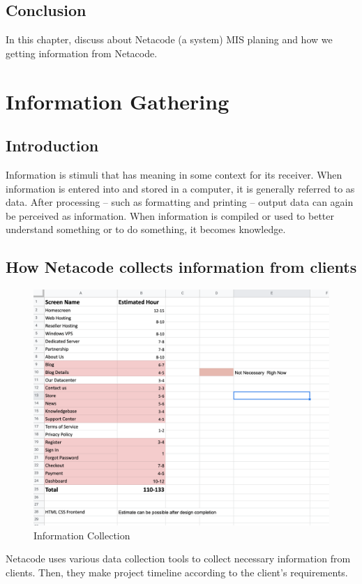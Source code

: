 \documentclass[a4paper,12pt]{report}
\begin{document}
\section{Conclusion}
	In this chapter, discuss about Netacode (a system) MIS planing and how we getting information from Netacode.
	




\chapter{Information Gathering}
\section{Introduction}
Information is stimuli that has meaning in some context for its receiver. When information is entered into and stored in a computer, it is generally referred to as data. After processing -- such as formatting and printing -- output data can again be perceived as information. When information is compiled or used to better understand something or to do something, it becomes knowledge.
\section{How Netacode collects information from clients}
\begin{figure}[h]
	\centering
	\includegraphics[width=0.7\linewidth]{5_1}
	\caption{Information Collection}
	\label{fig:51}
\end{figure}
Netacode uses various data collection tools to collect necessary information from clients. Then, they make project timeline according to the client's requirements. 
\end{document}
